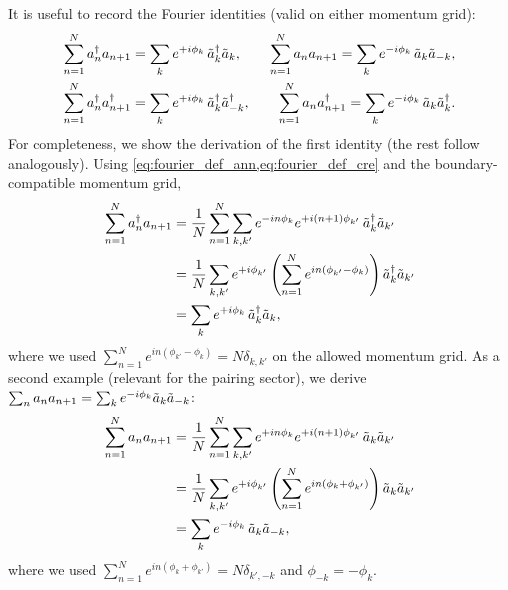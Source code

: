 \documentclass[aps,prx,twocolumn,superscriptaddress,nofootinbib,nolongbibliography,nobalancelastpage,10pt,floatfix]{revtex4-2}
\begin{document}
It is useful to record the Fourier identities (valid on either momentum grid):
\begin{align}
    \sum_{n=1}^N a_n^\dag a_{n+1} &= \sum_k e^{+i\phi_k}\,\tilde{a}_k^\dag\tilde{a}_k, \qquad
    \sum_{n=1}^N a_n a_{n+1} = \sum_k e^{-i\phi_k}\,\tilde{a}_k\tilde{a}_{-k},\\
    \sum_{n=1}^N a_n^\dag a_{n+1}^\dag &= \sum_k e^{+i\phi_k}\,\tilde{a}_k^\dag\tilde{a}_{-k}^\dag,\qquad
    \sum_{n=1}^N a_n a_{n+1}^\dag = \sum_k e^{-i\phi_k}\,\tilde{a}_k\tilde{a}_k^\dag.
\end{align}
For completeness, we show the derivation of the first identity (the rest follow analogously).
Using \cref{eq:fourier_def_ann,eq:fourier_def_cre} and the boundary-compatible momentum grid,
\begin{align}
    \sum_{n=1}^N a_n^\dag a_{n+1}
    &= \frac{1}{N}\sum_{n=1}^N \sum_{k,k'} e^{-in\phi_k} e^{+i(n+1)\phi_{k'}}\,\tilde{a}_k^\dag \tilde{a}_{k'} \nonumber\\
    &= \frac{1}{N}\sum_{k,k'} e^{+i\phi_{k'}} \left(\sum_{n=1}^N e^{in(\phi_{k'}-\phi_k)}\right)\tilde{a}_k^\dag \tilde{a}_{k'} \nonumber\\
    &= \sum_k e^{+i\phi_k}\,\tilde{a}_k^\dag \tilde{a}_k,
\end{align}
where we used $\sum_{n=1}^N e^{in(\phi_{k'}-\phi_k)}=N\delta_{k,k'}$ on the allowed momentum grid.
As a second example (relevant for the pairing sector), we derive
$\sum_n a_n a_{n+1}=\sum_k e^{-i\phi_k}\tilde{a}_k\tilde{a}_{-k}$:
\begin{align}
    \sum_{n=1}^N a_n a_{n+1}
    &= \frac{1}{N}\sum_{n=1}^N \sum_{k,k'} e^{+in\phi_k} e^{+i(n+1)\phi_{k'}}\,\tilde{a}_k \tilde{a}_{k'} \nonumber\\
    &= \frac{1}{N}\sum_{k,k'} e^{+i\phi_{k'}} \left(\sum_{n=1}^N e^{in(\phi_{k}+\phi_{k'})}\right)\tilde{a}_k \tilde{a}_{k'} \nonumber\\
    &= \sum_k e^{-i\phi_{k}}\,\tilde{a}_k \tilde{a}_{-k},
\end{align}
where we used $\sum_{n=1}^N e^{in(\phi_{k}+\phi_{k'})}=N\delta_{k',-k}$ and $\phi_{-k}=-\phi_k$.
\end{document}
